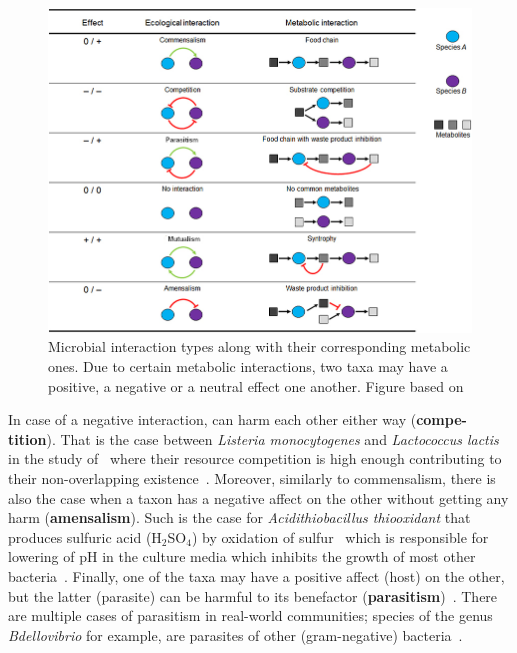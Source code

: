       \begin{figure}[!h]
         \centering
         \includegraphics[width=.9\textwidth]{figures/interaction_types.jpg}
         \caption[Microbial interactions types]{Microbial interaction types along 
         with their corresponding metabolic ones.
         Due to certain metabolic interactions, two taxa may have a positive, a negative
         or a neutral effect one another. 
         Figure based on \citep{perez2016metabolic}}
         \label{fig:micro-inter-types}
      \end{figure}

      In case of a negative interaction, can harm each other either way (\textbf{compe-tition}). 
      That is the case between 
      \textit{Listeria monocytogenes} and \textit{Lactococcus lactis} in the study of~\citeauthor{freilich2010large} where their resource competition is high enough
      contributing to their non-overlapping existence~\citep{freilich2010large}.
      Moreover, similarly to commensalism, 
      there is also the case when a taxon has a negative affect on the other
      without getting any harm (\textbf{amensalism}). 
      Such is the case for \textit{Acidithiobacillus thiooxidant} that produces
      sulfuric acid (H$_2$SO$_4$) by oxidation of sulfur~\citep{bobadilla2013stoichiometric} which is responsible for lowering of pH in the culture media which inhibits the growth of most other bacteria~\citep{jin2018ph}.
      Finally, one of the taxa may have a positive affect (host) on the other, but the 
      latter (parasite) can be harmful to its benefactor (\textbf{parasitism})~\citep{faust2012microbial}. 
      There are multiple cases of parasitism in real-world communities; 
      species of the genus \textit{Bdellovibrio} for example, are parasites of other (gram-negative) bacteria~\citep{stolp1979interactions}.

